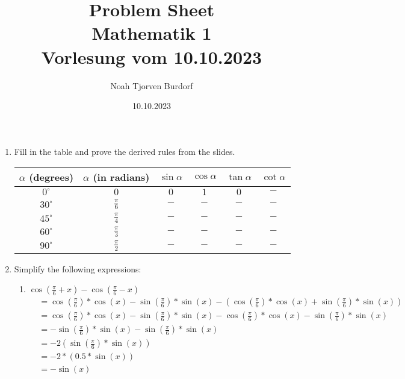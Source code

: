 \documentclass[a4paper,onecolumn,draft,pdftex]{report}
\begin{document}
    \author{Noah Tjorven Burdorf}
    \title{Problem Sheet \\ Mathematik 1 \\ Vorlesung vom 10.10.2023}
    \date{10.10.2023}
    \maketitle


    \begin{enumerate}
        \item Fill in the table and prove the derived rules from the slides. \\
        \vspace{30px}
        \begin{tabular}{|c|c|c|c|c|c|}
            $\alpha$ (degrees) & $\alpha$ (in radians) & $\sin \alpha$ & $\cos \alpha$ & $\tan \alpha$ & $\cot \alpha$ \\
            \hline
            $0^\circ$ & $0$ & $0$ & $1$ & $0$ & $-$ \\
            $30^\circ$ & $\frac{\pi}{6}$ & $-$ & $-$ & $-$ & $-$ \\
            $45^\circ$ & $\frac{\pi}{4}$ & $-$ & $-$ & $-$ & $-$ \\
            $60^\circ$ & $\frac{\pi}{3}$ & $-$ & $-$ & $-$ & $-$ \\
            $90^\circ$ & $\frac{\pi}{2}$ & $-$ & $-$ & $-$ & $-$ \\ 
        \end{tabular}
        \item Simplify the following expressions:
            \begin{enumerate}
                \item $\cos(\frac{\pi}{6}+x)-\cos(\frac{\pi}{6}-x)$
                \begin{align*}
                    &= \cos(\frac{\pi}{6})*\cos(x)-\sin(\frac{\pi}{6})*\sin(x)-(\cos(\frac{\pi}{6})*\cos(x)+\sin(\frac{\pi}{6})*\sin(x)) \\
                    &= \cos(\frac{\pi}{6})*\cos(x)-\sin(\frac{\pi}{6})*\sin(x)-\cos(\frac{\pi}{6})*\cos(x)-\sin(\frac{\pi}{6})*\sin(x) \\
                    &= -\sin(\frac{\pi}{6})*\sin(x)-\sin(\frac{\pi}{6})*\sin(x) \\
                    &= -2(\sin(\frac{\pi}{6})*\sin(x)) \\
                    &= -2*(0.5*\sin(x)) \\
                    &= -\sin(x)
                \end{align*}

\end{enumerate}
\end{enumerate}
\end{document}
